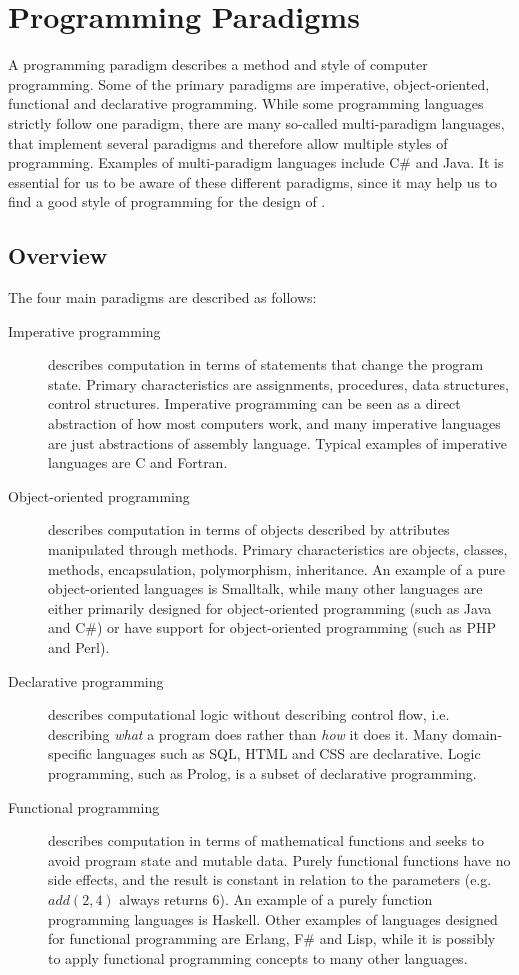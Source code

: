 \section{Programming Paradigms}
\label{sec:paradigms}

A programming paradigm describes a method and style of computer programming.
Some of the primary paradigms are imperative, object-oriented, functional and declarative programming. While some programming languages strictly follow one paradigm, there are many so-called multi-paradigm languages, that implement several paradigms and therefore allow multiple styles of programming. Examples of multi-paradigm languages include C\# and Java. It is essential for us to be aware of these different paradigms, since it may help us to find a good style of programming for the design of \productname{}.

\subsection{Overview}
The four main paradigms are described as follows:
\begin{description}
\item[Imperative programming] describes computation in terms of statements that change the program state. Primary characteristics are assignments, procedures, data structures, control structures. Imperative programming can be seen as a direct abstraction of how most computers work, and many imperative languages are just abstractions of assembly language. Typical examples of imperative languages are C and Fortran.
\item[Object-oriented programming] describes computation in terms of objects described by attributes manipulated through methods. Primary characteristics are objects, classes, methods, encapsulation, polymorphism, inheritance. An example of a pure object-oriented languages is Smalltalk, while many other languages are either primarily designed for object-oriented programming (such as Java and C\#) or have support for object-oriented programming (such as PHP and Perl).
\item[Declarative programming] describes computational logic without describing control flow, i.e. describing {\em what} a program does rather than {\em how} it does it. Many domain-specific languages such as SQL, HTML and CSS are declarative. Logic programming, such as Prolog, is a subset of declarative programming.
\item[Functional programming] describes computation in terms of mathematical functions and seeks to avoid program state and mutable data. Purely functional functions have no side effects, and the result is constant in relation to the parameters (e.g. $add(2, 4)$ always returns $6$). An example of a purely function programming languages is Haskell. Other examples of languages designed for functional programming are Erlang, F\# and Lisp, while it is possibly to apply functional programming concepts to many other languages.
\end{description}

